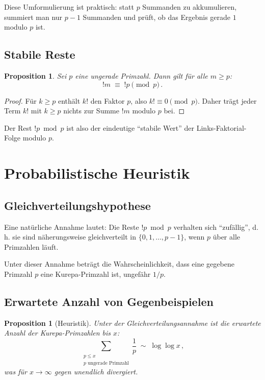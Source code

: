 \documentclass[12pt,a4paper]{amsart}
\newtheorem{proposition}[theorem]{Proposition}
\theoremstyle{definition}
\begin{document}
Diese Umformulierung ist praktisch: statt $p$ Summanden zu akkumulieren,
summiert man nur $p-1$ Summanden und prüft, ob das Ergebnis gerade $1$ modulo
$p$ ist.

\subsection{Stabile Reste}

\begin{proposition}
Sei $p$ eine ungerade Primzahl. Dann gilt für alle $m \geq p$:
\[
  !m \;\equiv\; !p \pmod{p}\,.
\]
\end{proposition}
\begin{proof}
Für $k \geq p$ enthält $k!$ den Faktor $p$, also $k! \equiv 0 \pmod p$.
Daher trägt jeder Term $k!$ mit $k \geq p$ nichts zur Summe $!m$ modulo $p$
bei.
\end{proof}

Der Rest $!p \bmod p$ ist also der eindeutige ``stabile Wert'' der Links-Fakto\-rial-Folge modulo $p$.

\section{Probabilistische Heuristik}
\label{sec:heuristik}

\subsection{Gleichverteilungshypothese}

Eine natürliche Annahme lautet: Die Reste $!p \bmod p$ verhalten sich
``zufällig'', d.\,h. sie sind näherungsweise gleichverteilt in
$\{0, 1, \ldots, p-1\}$, wenn $p$ über alle Primzahlen läuft.

Unter dieser Annahme beträgt die Wahrscheinlichkeit, dass eine gegebene
Primzahl $p$ eine Kurepa-Primzahl ist, ungefähr $1/p$.

\subsection{Erwartete Anzahl von Gegenbeispielen}

\begin{proposition}[Heuristik]
Unter der Gleichverteilungsannahme ist die erwartete Anzahl der
Kurepa-Primzahlen bis $x$:
\[
  \sum_{\substack{p \leq x \\ p \text{ ungerade Primzahl}}} \frac{1}{p}
  \;\sim\; \log\log x\,,
\]
was für $x \to \infty$ gegen unendlich divergiert.
\end{proposition}
\end{document}
